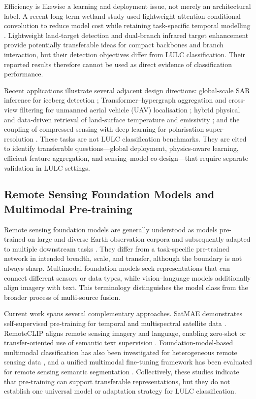 \documentclass[]{interact}
\theoremstyle{plain}%
\theoremstyle{definition}
\theoremstyle{remark}
\begin{document}
Efficiency is likewise a learning and deployment issue, not merely an architectural label. A recent long-term wetland study used lightweight attention-conditional convolution to reduce model cost while retaining task-specific temporal modelling \citep{yin2026lacc}. Lightweight land-target detection \citep{wang2024cgbiyolo} and dual-branch infrared target enhancement \citep{wang2025dabfnet} provide potentially transferable ideas for compact backbones and branch interaction, but their detection objectives differ from LULC classification. Their reported results therefore cannot be used as direct evidence of classification performance.

Recent applications illustrate several adjacent design directions: global-scale SAR inference for iceberg detection \citep{xie2026iceberg}; Transformer--hypergraph aggregation and cross-view filtering for unmanned aerial vehicle (UAV) localisation \citep{huang2026htgl,su2026cpfl}; hybrid physical and data-driven retrieval of land-surface temperature and emissivity \citep{wang2024lst}; and the coupling of compressed sensing with deep learning for polarisation super-resolution \citep{wu2026polarization}. These tasks are not LULC classification benchmarks. They are cited to identify transferable questions---global deployment, physics-aware learning, efficient feature aggregation, and sensing--model co-design---that require separate validation in LULC settings.

\subsection{Remote Sensing Foundation Models and Multimodal Pre-training}

Remote sensing foundation models are generally understood as models pre-trained on large and diverse Earth observation corpora and subsequently adapted to multiple downstream tasks \citep{cong2022satmae,liu2024remoteclip}. They differ from a task-specific pre-trained network in intended breadth, scale, and transfer, although the boundary is not always sharp. Multimodal foundation models seek representations that can connect different sensors or data types, while vision--language models additionally align imagery with text. This terminology distinguishes the model class from the broader process of multi-source fusion.

Current work spans several complementary approaches. SatMAE demonstrates self-supervised pre-training for temporal and multispectral satellite data \citep{cong2022satmae}. RemoteCLIP aligns remote sensing imagery and language, enabling zero-shot or transfer-oriented use of semantic text supervision \citep{liu2024remoteclip}. Foundation-model-based multimodal classification has also been investigated for heterogeneous remote sensing data \citep{he2024foundation}, and a unified multimodal fine-tuning framework has been evaluated for remote sensing semantic segmentation \citep{ma2025multimodal}. Collectively, these studies indicate that pre-training can support transferable representations, but they do not establish one universal model or adaptation strategy for LULC classification.
\end{document}
